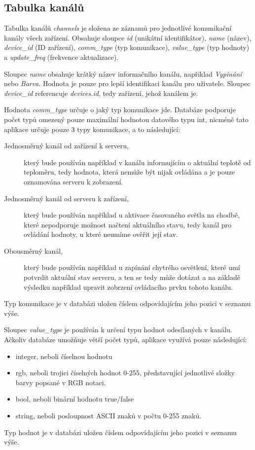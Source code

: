 \subsection{Tabulka kanálů}
Tabulka kanálů \emph{channels} je složena ze záznamů pro jednotlivé komunikační kanály všech zařízení. Obsahuje sloupce \emph{id} (unikátní identifikátor), \emph{name} (název), \emph{device\_id} (ID zařízení), \emph{comm\_type} (typ komunikace), \emph{value\_type} (typ hodnoty) a \emph{update\_freq} (frekvence aktualizace).

Sloupec \emph{name} obsahuje krátký název informačního kanálu, například \emph{Vypínání} nebo \emph{Barva}. Hodnota je pouze pro lepší identifikaci kanálu pro uživatele. Sloupec \emph{device\_id} referencuje \emph{devices.id}, tedy zařízení, jehož kanálem je.

Hodnota \emph{comm\_type} určuje o jaký typ komunikace jde. Databáze podporuje počet typů omezený pouze maximální hodnotou datového typu int, nicméně tato aplikace určuje pouze 3 typy komunikace, a to následující:
\begin{description}
    \item[Jednosměrný kanál od zařízení k serveru,] který bude používán například v kanálu informujícím o aktuální teplotě od teploměru, tedy hodnota, která nemůže být nijak ovládána a je pouze oznamována serveru k zobrazení.
    \item[Jednosměrný kanál od serveru k zařízení,] který bude používán například u aktivace časovaného světla na chodbě, které nepodporuje možnost načtení aktuálního stavu, tedy kanál pro ovládání hodnoty, u které neumíme ověřit její stav.
    \item[Obousměrný kanál,] který bude používán například u zapínání chytrého osvětlení, které umí potvrdit aktuální stav serveru, a ten se tedy může dotázat a na základě výsledku například upravit zobrzení ovládacího prvku tohoto kanálu.
\end{description}
Typ komunikace je v databázi uložen číslem odpovídajícím jeho pozici v seznamu výše.

Sloupec \emph{value\_type} je používán k určení typu hodnot odesílaných v kanálu. Ačkoliv databáze umožňuje větší počet typů, aplikace využívá pouze následující:
\begin{itemize}
    \item{integer}, neboli číselnou hodnotu
    \item{rgb}, neboli trojici číselných hodnot 0-255, představující jednotlivé složky barvy popsané v RGB notaci.
    \item{bool}, neboli binární hodnotu true/false
    \item{string}, neboli posloupnost ASCII znaků v počtu 0-255 znaků.
\end{itemize}
Typ hodnot je v databázi uložen číslem odpovídajícím jeho pozici v seznamu výše.

